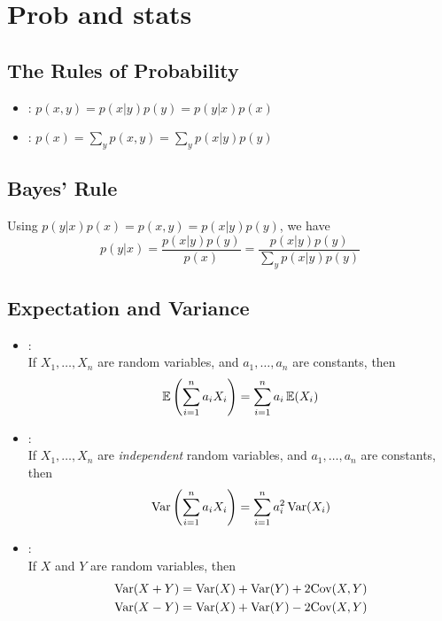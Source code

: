 \documentclass[11pt]{article}
\begin{document}
\section{Prob and stats}
\subsection{The Rules of Probability}
\begin{itemize}
  \item {}: $p(x, y) = p(x|y) p(y) = p(y|x) p(x)$
  \item {}: $p(x) = \sum\limits_y p(x, y) = \sum\limits_y p(x | y) p(y)$
\end{itemize}

\subsection{Bayes' Rule}
Using $p(y|x) p(x) = p(x,y) = p(x|y) p(y)$, we have
\begin{equation}
  p(y|x) = \frac{p(x|y) p(y)}{p(x)} = \frac{p(x|y) p(y)}{\sum\limits_y p(x|y) p(y)}
\end{equation}

\subsection{Expectation and Variance}
\label{sec:ExpVar}
\begin{itemize}
  \item {}:\\
  If $X_1, \dots, X_n$ are random variables, and $a_1, \dots, a_n$ are constants, then
  \begin{equation}
    \mathbb{E} \left( \sum_{i=1}^n a_i X_i \right) = \sum_{i=1}^n a_i\, \mathbb{E} (X_i)
  \end{equation}

  \item {}:\\
  If $X_1, \dots, X_n$ are \emph{independent} random variables, and $a_1, \dots, a_n$
  are constants, then
  \begin{equation}
    \textrm{Var} \left( \sum_{i=1}^n a_i X_i \right) = \sum_{i=1}^n a_i^2\, \textrm{Var} (X_i)
  \end{equation}

  \item {}:\\
  If $X$ and $Y$ are random variables, then
  \begin{align}
    \textrm{Var} (X + Y) &= \textrm{Var}(X) + \textrm{Var}(Y) + 2 \textrm{Cov}(X, Y) \nonumber\\
    \textrm{Var} (X - Y) &= \textrm{Var}(X) + \textrm{Var}(Y) - 2 \textrm{Cov}(X, Y)
  \end{align}
  
\end{itemize}
\end{document}
